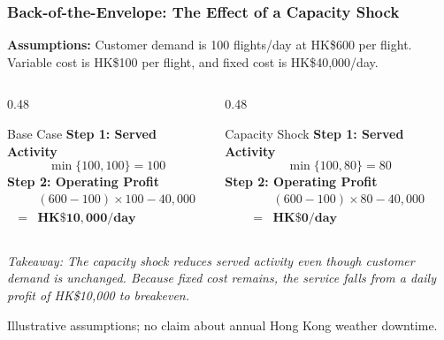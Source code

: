 \documentclass{beamer}
\begin{document}
\begin{frame}[t]
\frametitle{Back-of-the-Envelope: The Effect of a Capacity Shock}

\setlength{\abovedisplayskip}{2pt}
\setlength{\belowdisplayskip}{2pt}

\small
\textbf{Assumptions:} Customer demand is 100 flights/day at HK\$600 per flight. Variable cost is HK\$100 per flight, and fixed cost is HK\$40,000/day.

\vspace{0.15cm}

\begin{columns}[T]
  \begin{column}{0.48\textwidth}
    \begin{block}{Base Case}
      \textbf{Step 1: Served Activity}
      \[
      \min\{100, 100\} = 100
      \]
      \vspace{-0.1cm}
      \textbf{Step 2: Operating Profit}
      \[
      \begin{aligned}
        & (600 - 100) \times 100 - 40{,}000 \\
        ={} & \mathbf{HK\$10{,}000/\text{day}}
      \end{aligned}
      \]
    \end{block}
  \end{column}

  \begin{column}{0.48\textwidth}
    \begin{block}{Capacity Shock}
      \textbf{Step 1: Served Activity}
      \[
      \min\{100, 80\} = 80
      \]
      \vspace{-0.1cm}
      \textbf{Step 2: Operating Profit}
      \[
      \begin{aligned}
        & (600 - 100) \times 80 - 40{,}000 \\
        ={} & \mathbf{HK\$0/\text{day}}
      \end{aligned}
      \]
    \end{block}
  \end{column}
\end{columns}

\vspace{0.2cm}

\footnotesize
\textit{Takeaway: The capacity shock reduces served activity even though customer demand is unchanged. Because fixed cost remains, the service falls from a daily profit of HK\$10,000 to breakeven.}

\vfill
{\tiny Illustrative assumptions; no claim about annual Hong Kong weather downtime.}
\end{frame}
\end{document}
